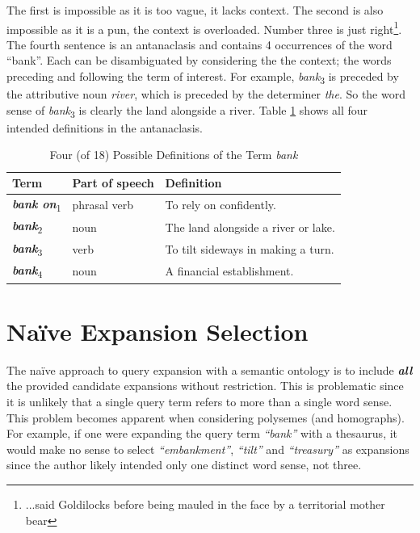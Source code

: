 The first is impossible as it is too vague, it lacks context. The second is also impossible as it is a pun, the context is overloaded. Number three is just right\footnote{...said Goldilocks before being mauled in the face by a territorial mother bear}. The fourth sentence is an antanaclasis and contains 4 occurrences of the word ``bank''. Each can be disambiguated by considering the the context; the words preceding and following the term of interest. For example, \textit{bank}\textsubscript{3} is preceded by the attributive noun \textit{river}, which is preceded by the determiner \textit{the}. So the word sense of \textit{bank}\textsubscript{3} is clearly the land alongside a river. Table \ref{bank-definitions} shows all four intended definitions in the antanaclasis.


\begin{table}[h]
\centering
\begin{tabular}{|l|l|l|}
\hline
Term    & Part of speech & Definition                          \\ \hline
\textbf{\textit{bank on}}\textsubscript{1} & phrasal verb & To rely on confidently.             \\
\textbf{\textit{bank}}\textsubscript{2}    & noun & The land alongside a river or lake. \\
\textbf{\textit{bank}}\textsubscript{3}    & verb & To tilt sideways in making a turn.  \\
\textbf{\textit{bank}}\textsubscript{4}    & noun & A financial establishment.          \\ \hline
\end{tabular}
\caption{Four (of 18) Possible Definitions of the Term \textit{bank}}
\label{bank-definitions}
\end{table}


\section{Na{\"i}ve Expansion Selection} \label{standardTS}
The na{\"i}ve approach to query expansion with a semantic ontology is to include \textit{\textbf{all}} the provided candidate expansions without restriction. This is problematic since it is unlikely that a single query term refers to more than a single word sense. This problem becomes apparent when considering polysemes (and homographs). For example, if one were expanding the query term \textit{``bank''} with a thesaurus, it would make no sense to select \textit{``embankment''}, \textit{``tilt''} and \textit{``treasury''} as expansions since the author likely intended only one distinct word sense, not three.

